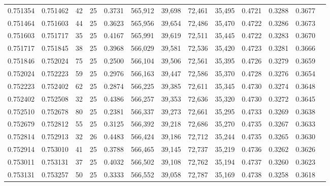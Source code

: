 \begin{tabular}{rrrrrrrrrrrrr}
0.751354 & 0.751462 &    42 &  25 &                                     0.3731 & 565,912 &  39,698 &  72,461 &  35,495 & 0.4721 & 0.3288 & 0.3677 \\
0.751464 & 0.751603 &    44 &  25 &                                     0.3623 & 565,956 &  39,654 &  72,486 &  35,470 & 0.4722 & 0.3286 & 0.3673 \\
0.751603 & 0.751717 &    35 &  25 &                                     0.4167 & 565,991 &  39,619 &  72,511 &  35,445 & 0.4722 & 0.3283 & 0.3670 \\
0.751717 & 0.751845 &    38 &  25 &                                     0.3968 & 566,029 &  39,581 &  72,536 &  35,420 & 0.4723 & 0.3281 & 0.3666 \\
0.751846 & 0.752024 &    75 &  25 &                                     0.2500 & 566,104 &  39,506 &  72,561 &  35,395 & 0.4726 & 0.3279 & 0.3659 \\
0.752024 & 0.752223 &    59 &  25 &                                     0.2976 & 566,163 &  39,447 &  72,586 &  35,370 & 0.4728 & 0.3276 & 0.3654 \\
0.752223 & 0.752402 &    62 &  25 &                                     0.2874 & 566,225 &  39,385 &  72,611 &  35,345 & 0.4730 & 0.3274 & 0.3648 \\
0.752402 & 0.752508 &    32 &  25 &                                     0.4386 & 566,257 &  39,353 &  72,636 &  35,320 & 0.4730 & 0.3272 & 0.3645 \\
0.752510 & 0.752678 &    80 &  25 &                                     0.2381 & 566,337 &  39,273 &  72,661 &  35,295 & 0.4733 & 0.3269 & 0.3638 \\
0.752679 & 0.752812 &    55 &  25 &                                     0.3125 & 566,392 &  39,218 &  72,686 &  35,270 & 0.4735 & 0.3267 & 0.3633 \\
0.752814 & 0.752913 &    32 &  26 &                                     0.4483 & 566,424 &  39,186 &  72,712 &  35,244 & 0.4735 & 0.3265 & 0.3630 \\
0.752914 & 0.753010 &    41 &  25 &                                     0.3788 & 566,465 &  39,145 &  72,737 &  35,219 & 0.4736 & 0.3262 & 0.3626 \\
0.753011 & 0.753131 &    37 &  25 &                                     0.4032 & 566,502 &  39,108 &  72,762 &  35,194 & 0.4737 & 0.3260 & 0.3623 \\
0.753131 & 0.753257 &    50 &  25 &                                     0.3333 & 566,552 &  39,058 &  72,787 &  35,169 & 0.4738 & 0.3258 & 0.3618 \\

\end{tabular}
